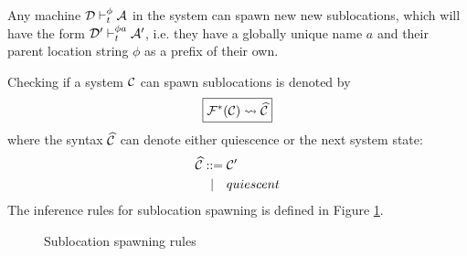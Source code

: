 Any machine $\mathcal{D} \vdash_t^\phi \mathcal{A}$ in the system can spawn new new sublocations,
which will have the form $\mathcal{D}' \vdash_t^{\phi a} \mathcal{A}'$, i.e. they have a globally
unique name $a$ and their parent location string $\phi$ as a prefix of their
own.

Checking if a system $\mathcal{C}$ can spawn sublocations is denoted by
\begin{equation*}
\boxed{\mathcal{F}^*(\mathcal{C}) \leadsto \widehat{\mathcal{C}}}
\end{equation*}
where the syntax $\widehat{\mathcal{C}}$ can denote either quiescence or the next system state:
\begin{align*}
 \widehat{\mathcal{C}} ::={}& \mathcal{C}' \\
    |\quad{}& quiescent
\end{align*}
The inference rules for sublocation spawning is defined in Figure
\ref{fig:rule:spawn}.

\begin{figure}[!ht]
\caption{Sublocation spawning rules}\label{fig:rule:spawn}
\end{figure}


